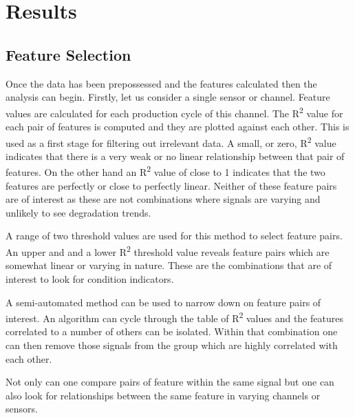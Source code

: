 \documentclass[]{article}
\begin{document}

 

\section{Results}
\subsection{Feature Selection}
Once the data has been prepossessed and the features calculated then the analysis can begin. Firstly, let us consider a single sensor or channel. Feature values are calculated for each production cycle of this channel. The R\textsuperscript{2} value for each pair of features is computed and they are plotted against each other. This is used as a first stage for filtering out irrelevant data. A small, or zero, R\textsuperscript{2} value indicates that there is a very weak or no linear relationship between that pair of features. On the other hand an R\textsuperscript{2} value of close to 1 indicates that the two features are perfectly or close to perfectly linear. Neither of these feature pairs are of interest as these are not combinations where signals are varying and unlikely to see degradation trends. 

A range of two threshold values are used for this method to select feature pairs. An upper and and a lower R\textsuperscript{2} threshold value reveals feature pairs which are somewhat linear or varying in nature. These are the combinations that are of interest to look for condition indicators.

A semi-automated method can be used to narrow down on feature pairs of interest. An algorithm can cycle through the table of R\textsuperscript{2} values and the features correlated to a number of others can be isolated. Within that combination one can then remove those signals from the group which are highly correlated with each other.

Not only can one compare pairs of feature within the same signal but one can also look for relationships between the same feature in varying channels or sensors. 
\end{document}
